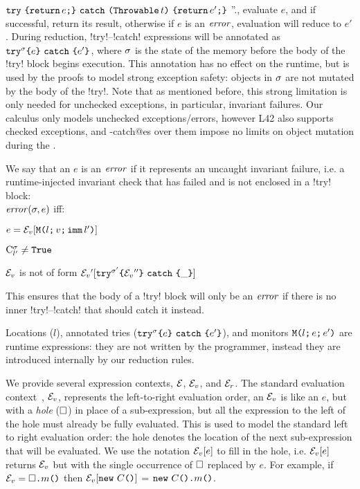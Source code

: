 \begin{itemize}
{		$\Kw{try}\ %
			\oC\Kw{return}\,e\semiColon\cC\ %
		\Kw{catch}\ %
			\oR\Kw{Throwable}\, t\cR\ %
			\oC\Kw{return}\,e'\semiColon\cC$%
		''.},
		evaluate $e$, and if successful, return its result, otherwise if $e$ is an $\mathit{error}$, evaluation will reduce to $e'$.
	During reduction, \Q!try!--\Q!catch! expressions will be annotated as $\texttt{try}^{\sigma}\texttt{\{} e\texttt{\}}\ \texttt{catch}\ \texttt{\{} e'\texttt{\}}$, where $\sigma$ is the state of the memory before the body of the \Q!try! block begins execution. This annotation has no effect on the runtime, but is used by the proofs to model strong exception safety: objects in $\sigma$ are not mutated by the body of the \Q!try!. Note that as mentioned before, this strong limitation is only needed for unchecked exceptions, in particular, invariant failures. Our calculus only models unchecked exceptions/errors, however L42 also supports checked exceptions, and \Q@try-catch@es over them impose no limits on object mutation during the \Q@try@.
\end{itemize}

We say that an $e$ is an $\mathit{error}$ if it represents an uncaught invariant failure, i.e. a runtime-injected invariant check that has failed and is not enclosed in a \Q!try! block:\\
\indent $\mathit{error}(\sigma, e)$ iff:
\begin{iitemize}
	\item $e = \mathcal{E}_v{}[\texttt{M}\texttt{(}{}l\texttt{;}\,v\texttt{;}\,\texttt{imm}\,l'\texttt{)}]$\SS
	\item $\mathrm{C}^{\sigma}_{l'} \neq \texttt{True}$\SS
	\item $\mathcal{E}_v{}$ is not of form $\mathcal{E}_v{}'[\texttt{try}^{\sigma'}\texttt{\{}\mathcal{E}_v{}''\texttt{\}}\ \texttt{catch}\ \texttt{\{}\_\texttt{\}}]$
\end{iitemize}
This ensures that the body of a \Q!try! block will only be an $\mathit{error}$ if there is no inner \Q!try!--\Q!catch! that should catch it instead.

Locations ($l$), annotated tries ($\texttt{try}^{\sigma}\texttt{\{} e\texttt{\}}\ \texttt{catch}\ \texttt{\{} e'\texttt{\}}$), and monitors $\texttt{M}\texttt{(}{}l\texttt{;}\,e\texttt{;}\,e'\texttt{)}$ are runtime expressions: they are not written by the programmer, instead they are introduced internally by our reduction rules.

We provide several expression contexts, $\mathcal{E}$, $\mathcal{E}_v{}$, and $\mathcal{E}_r{}$. 
The standard evaluation context~\cite[Chapter~19]{pierce2002types}, $\mathcal{E}_v{}$, represents the left-to-right evaluation order, an $\mathcal{E}_v{}$ is like an $e$, but with a \emph{hole} ($\square$) in place of a sub-expression,
	but all the expression to the left of the hole must already be fully evaluated. This is used to model the standard left to right evaluation order: the hole denotes the location of the next sub-expression that will be evaluated. We use the notation $\mathcal{E}_v{}[e]$ to fill in the hole, i.e. $\mathcal{E}_v{}[e]$ returns $\mathcal{E}_v{}$ but with the single occurrence of $\square$ replaced by $e$.
	For example, if $\mathcal{E}_v{} = \square\texttt{.} m\texttt{(}\texttt{)}$ then $\mathcal{E}_v{}[\texttt{new}\ C\texttt{(}\texttt{)}]$ = $\texttt{new}\ C\texttt{(}\texttt{)}\texttt{.} m\texttt{(}\texttt{)}$.

